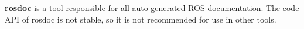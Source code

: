 

{\bfseries rosdoc} is a tool responsible for all auto-\/generated R\-O\-S documentation. The code A\-P\-I of rosdoc is not stable, so it is not recommended for use in other tools. 